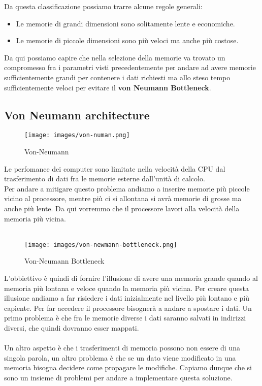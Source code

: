 \hspace{-15pt}Da questa classificazione possiamo trarre alcune regole generali:
\begin{itemize}
    \item Le memorie di grandi dimensioni sono solitamente lente e economiche.
    \item Le memorie di piccole dimensioni sono più veloci ma anche più costose.
\end{itemize}

\hspace{-15pt}Da qui possiamo capire che nella selezione della memorie va trovato un compromesso fra i parametri visti precedentemente per andare ad avere memorie sufficientemente grandi per contenere i dati richiesti ma allo steso tempo sufficientemente veloci per evitare il \textbf{von Neumann Bottleneck}.

\subsection{Von Neumann architecture}
\begin{wrapfigure}{r}{6.5cm}
    \vspace{-25pt}
    \centering
    \texttt{[image: images/von-numan.png]}
    \caption{Von-Neumann}
\end{wrapfigure}
Le perfomance dei computer sono limitate nella velocità della CPU dal trasferimento di dati fra le memorie esterne dall'unità di calcolo.\\
Per andare a mitigare questo problema andiamo a inserire memorie più piccole vicino al processore, mentre più ci si allontana si avrà memorie di grosse ma anche più lente. Da qui vorremmo che il processore lavori alla velocità della memoria più vicina.\\\\

\begin{wrapfigure}{l}{6.5cm}
    \vspace{-10pt}
    \centering
    \texttt{[image: images/von-newmann-bottleneck.png]}
    \caption{Von-Neumann Bottleneck}
\end{wrapfigure}
L'obbiettivo è quindi di fornire l'illusione di avere una memoria grande quando al memoria più lontana e veloce quando la memoria più vicina.
Per creare questa illusione andiamo a far risiedere i dati inizialmente nel livello più lontano e più capiente. Per far accedere il processore bisognerà a andare a spostare i dati. Un primo problema è che fra le memorie diverse i dati saranno salvati in indirizzi diversi, che quindi dovranno esser mappati.\\\\
Un altro aspetto è che i trasferimenti di memoria possono non essere di una singola parola, un altro problema è che se un dato viene modificato in una memoria bisogna decidere come propagare le modifiche. Capiamo dunque che si sono un insieme di problemi per andare a implementare questa soluzione.


